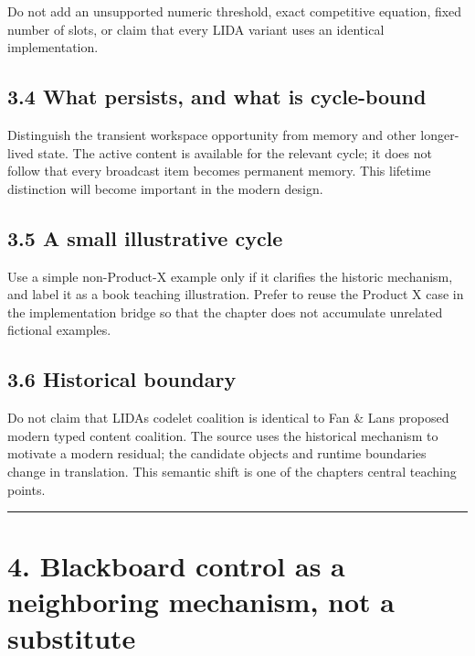 Do not add an unsupported numeric threshold, exact competitive equation, fixed number of slots, or claim that every LIDA variant uses an identical implementation.

\subsection{3.4 What persists, and what is cycle-bound}\label{34-what-persists-and-what-is-cycle-bound}

Distinguish the transient workspace opportunity from memory and other longer-lived state. The active content is available for the relevant cycle; it does not follow that every broadcast item becomes permanent memory. This lifetime distinction will become important in the modern design.

\subsection{3.5 A small illustrative cycle}\label{35-a-small-illustrative-cycle}

Use a simple non-Product-X example only if it clarifies the historic mechanism, and label it as a book teaching illustration. Prefer to reuse the Product X case in the implementation bridge so that the chapter does not accumulate unrelated fictional examples.

\subsection{3.6 Historical boundary}\label{36-historical-boundary}

Do not claim that LIDA\textquotesingle s codelet coalition is identical to Fan \& Lan\textquotesingle s proposed modern typed content coalition. The source uses the historical mechanism to motivate a modern residual; the candidate objects and runtime boundaries change in translation. This semantic shift is one of the chapter\textquotesingle s central teaching points.

\begin{center}\rule{0.5\linewidth}{0.5pt}\end{center}

\section{4. Blackboard control as a neighboring mechanism, not a substitute}\label{4-blackboard-control-as-a-neighboring-mechanism-not-a-substitute}

